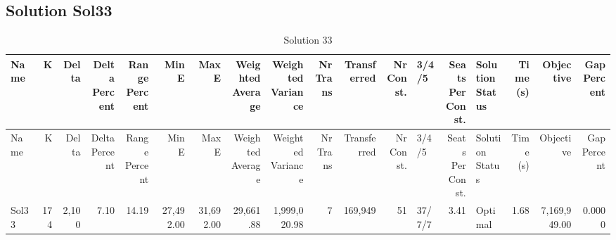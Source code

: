 \documentclass[a4paper]{article}
\begin{document}
\clearpage
\subsection{Solution Sol33}

{\scriptsize
\begin{longtable}{lrrrrrrrrrrrlrlrrr}
\caption{Solution 33}
\\ \toprule
Name &K &Delta &\shortstack{Delta\\Percent} &\shortstack{Range\\Percent} &Min E &Max E &\shortstack{Weighted\\Average} &\shortstack{Weighted\\Variance} &\shortstack{Nr\\Trans} &Transferred &\shortstack{Nr\\Const.} &3/4/5 &\shortstack{Seats\\Per\\Const.} &\shortstack{Solution\\Status} &\shortstack{Time\\(s)} &Objective &\shortstack{Gap\\Percent} \\ \midrule
\endfirsthead
\toprule
Name &K &Delta &\shortstack{Delta\\Percent} &\shortstack{Range\\Percent} &Min E &Max E &\shortstack{Weighted\\Average} &\shortstack{Weighted\\Variance} &\shortstack{Nr\\Trans} &Transferred &\shortstack{Nr\\Const.} &3/4/5 &\shortstack{Seats\\Per\\Const.} &\shortstack{Solution\\Status} &\shortstack{Time\\(s)} &Objective &\shortstack{Gap\\Percent} \\ \midrule
\endhead
\bottomrule
\endfoot
Sol33&174&2,100& 7.10&14.19&27,492.00&31,692.00&29,661.88&1,999,020.98&7&169,949&51&37/7/7& 3.41&Optimal& 1.68&7,169,949.00&0.0000\\ 
\end{longtable}

}
\end{document}
